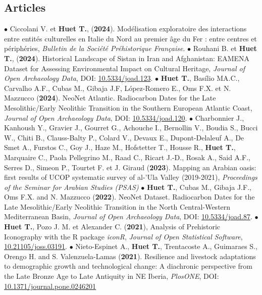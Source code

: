 \documentclass{article}
\newcommand{\fr}[1]{}       %
\newcommand{\en}[1]{#1}     %
\begin{document}
\subsection*{\fr{Articles}\en{Articles}}
$\bullet$ Ciccolani V. et \textbf{Huet T.}, (\textbf{2024}). Modélisation exploratoire des interactions entre entités culturelles en Italie du Nord au premier âge du Fer : entre centres et périphéries, \textit{Bulletin de la Soci\'{e}t\'{e} Pr\'{e}historique Fran\c{c}aise}.
\smallbreak
$\bullet$ Rouhani B. et \textbf{Huet T.}, (\textbf{2024}). Historical Landscape of Sistan in Iran and Afghanistan: EAMENA Dataset for Assessing Environmental Impact on Cultural Heritage, \textit{Journal of Open Archaeology Data}, DOI: \href{https://openarchaeologydata.metajnl.com/articles/10.5334/joad.123}{10.5334/joad.123}.
\smallbreak
$\bullet$ \textbf{Huet T.}, Basílio MA.C., Carvalho A.F., Cubas M., Gibaja J.F, López-Romero E., Oms F.X. et N. Mazzucco (\textbf{2024}). NeoNet Atlantic. Radiocarbon Dates for the Late Mesolithic/Early Neolithic Transition in the Southern European Atlantic Coast, \textit{Journal of Open Archaeology Data}, DOI: \href{https://openarchaeologydata.metajnl.com/articles/10.5334/joad.120}{10.5334/joad.120}.
\smallbreak
$\bullet$ Charbonnier J., Kanhoush Y., Gravier J., Gourret G., Achouche I., Bernollin V., Boudia S., Bucci W., Chiti B., Clauss-Balty P., Colard V., Devaux E., Dupont-Delaleuf A., De Smet A., Furstos C., Goy J., Haze M., Hofstetter T., Housse R., \textbf{Huet T.}, Marquaire C., Paola Pellegrino M., Raad C., Ricart J.-D., Rosak A., Said A.F., Serres D., Simeon P., Tourtet F. et J. Giraud (\textbf{2023}). Mapping an Arabian oasis: first results of UCOP systematic survey of al-'Ula Valley (2019-2021), \textit{Proceedings of the Seminar for Arabian Studies (PSAS)}
\smallbreak
$\bullet$ \textbf{Huet T.}, Cubas M., Gibaja J.F., Oms F.X. and N. Mazzucco (\textbf{2022}). NeoNet Dataset. Radiocarbon Dates for the Late Mesolithic/Early Neolithic Transition in the North Central-Western Mediterranean Basin, \textit{Journal of Open Archaeology Data}, DOI: \href{http://doi.org/10.5334/joad.87}{10.5334/joad.87}.
\smallbreak
$\bullet$ \textbf{Huet T.}, Pozo J. M. et Alexander C. (\textbf{2021}), Analysis of Prehistoric Iconography with the R package \textit{iconR}, \textit{Journal of Open Statistical Software}, \href{https://joss.theoj.org/papers/10.21105/joss.03191}{10.21105/joss.03191}.
\smallbreak
$\bullet$ Nieto-Espinet A., \textbf{Huet T.}, Trentacoste A., Guimaraes S., Orengo H. and S. Valenzuela-Lamas (\textbf{2021}). Resilience and livestock adaptations to demographic growth and technological change: A diachronic perspective from the Late Bronze Age to Late Antiquity in NE Iberia, \textit{PlosONE}, DOI: \href{https://doi.org/10.1371/journal.pone.0246201}{10.1371/journal.pone.0246201}
\end{document}
